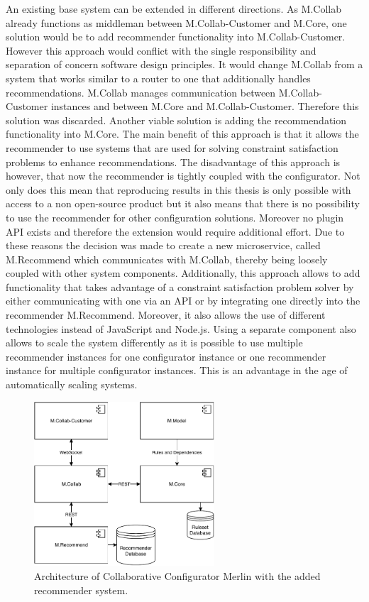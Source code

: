An existing base system can be extended in different directions. As M.Collab already functions as middleman between M.Collab-Customer and M.Core, one solution would be to add recommender functionality into M.Collab-Customer. However this approach would conflict with the single responsibility and separation of concern software design principles. It would change M.Collab from a system that works similar to a router to one that additionally handles  recommendations. M.Collab manages communication between M.Collab-Customer instances and between M.Core and M.Collab-Customer. Therefore this solution was discarded.
Another viable solution is adding the recommendation functionality into M.Core. The main benefit of this approach is that it allows the recommender to use systems that are used for solving constraint satisfaction problems to enhance recommendations. The disadvantage of this approach is however, that now the recommender is tightly coupled with the configurator. Not only does this mean that reproducing results in this thesis is only possible with access to a non open-source product but it also means that there is no possibility to use the recommender for other configuration solutions. Moreover no plugin API exists and therefore the extension would require additional effort. 
Due to these reasons the decision was made to create a new microservice, called M.Recommend which communicates with M.Collab, thereby being loosely coupled with other system components. Additionally, this approach allows to add functionality that takes  advantage of a constraint satisfaction problem solver by either communicating with one via an API or by integrating one directly into the recommender M.Recommend. Moreover, it also allows the use of different technologies instead of JavaScript and Node.js. Using a separate component also allows to scale the system differently as it is possible to use multiple recommender instances for one configurator instance or one recommender instance for multiple configurator instances. This is an advantage in the age of automatically scaling systems.

\begin{figure}
    \centering
    \includegraphics[width=0.6\textwidth]{./figures/50_design_and_implementation/MerlinCollabRecommender.pdf}
    \caption{Architecture of Collaborative Configurator Merlin with the added recommender system.}
    \label{fig:DesignImplementation:RecommenderForCollaborativeConfiguratorMerlin}
\end{figure}

